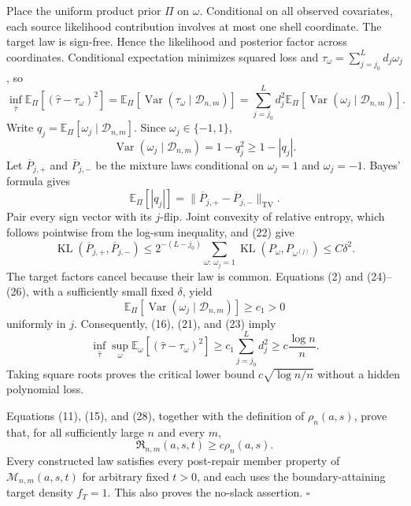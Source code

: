 Place the uniform product prior \(\Pi\) on \(\omega\).  Conditional on all observed covariates, each source likelihood contribution involves at most one shell coordinate.  The target law is sign-free.  Hence the likelihood and posterior factor across coordinates.  Conditional expectation minimizes squared loss and \(\tau_\omega=\sum_{j=j_0}^Ld_j\omega_j\), so
\[
 \inf_{\widehat\tau}
 \mathbb E_\Pi[(\widehat\tau-\tau_\omega)^2]
 =\mathbb E_\Pi[\operatorname{Var}(\tau_\omega\mid\mathcal D_{n,m})]
 =\sum_{j=j_0}^Ld_j^2
   \mathbb E_\Pi[\operatorname{Var}(\omega_j\mid\mathcal D_{n,m})].
\tag{23}
\]
Write \(q_j=\mathbb E_\Pi[\omega_j\mid\mathcal D_{n,m}]\).  Since \(\omega_j\in\{-1,1\}\),
\[
 \operatorname{Var}(\omega_j\mid\mathcal D_{n,m})
 =1-q_j^2\ge1-|q_j|.
\tag{24}
\]
Let \(\overline P_{j,+}\) and \(\overline P_{j,-}\) be the mixture laws conditional on \(\omega_j=1\) and \(\omega_j=-1\).  Bayes' formula gives
\[
 \mathbb E_\Pi[|q_j|]
 =\lVert\overline P_{j,+}-\overline P_{j,-}\rVert_{\mathrm{TV}}.
\tag{25}
\]
Pair every sign vector with its \(j\)-flip.  Joint convexity of relative entropy, which follows pointwise from the log-sum inequality, and (22) give
\[
 \operatorname{KL}(\overline P_{j,+},\overline P_{j,-})
 \le 2^{-(L-j_0)}
 \sum_{\omega:\,\omega_j=1}
 \operatorname{KL}(P_\omega,P_{\omega^{(j)}})
 \le C\delta^2.
\tag{26}
\]
The target factors cancel because their law is common.  Equations (2) and (24)--(26), with a sufficiently small fixed \(\delta\), yield
\[
 \mathbb E_\Pi[\operatorname{Var}
   (\omega_j\mid\mathcal D_{n,m})]
 \ge c_1>0
\tag{27}
\]
uniformly in \(j\).  Consequently, (16), (21), and (23) imply
\[
 \inf_{\widehat\tau}\sup_\omega
 \mathbb E_\omega[(\widehat\tau-\tau_\omega)^2]
 \ge c_1\sum_{j=j_0}^Ld_j^2
 \ge c\frac{\log n}{n}.
\tag{28}
\]
Taking square roots proves the critical lower bound \(c\sqrt{\log n/n}\) without a hidden polynomial loss.

Equations (11), (15), and (28), together with the definition of \(\rho_n(a,s)\), prove that, for all sufficiently large \(n\) and every \(m\),
\[
 \mathfrak R_{n,m}(a,s,t)\ge c\rho_n(a,s).
\]
Every constructed law satisfies every post-repair member property of \(\mathcal M_{n,m}(a,s,t)\) for arbitrary fixed \(t>0\), and each uses the boundary-attaining target density \(f_T=1\).  This also proves the no-slack assertion. \(\square\)
